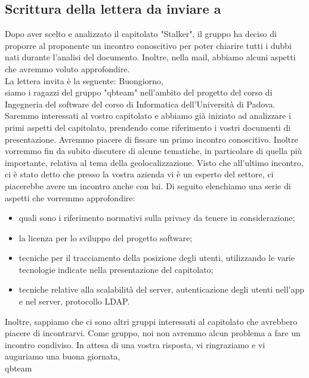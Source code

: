 \subsection{Scrittura della lettera da inviare a \ZD{}}
Dopo aver scelto e analizzato il capitolato "Stalker", il gruppo ha deciso di proporre al proponente \Proponente{} un incontro conoscitivo per poter chiarire tutti i dubbi nati durante l'analisi del documento. Inoltre, nella mail, abbiamo alcuni aspetti che avremmo voluto approfondire.
\\La lettera invita è la seguente:
\bigskip
\newline
Buongiorno,
\\siamo i ragazzi del gruppo "qbteam" nell'ambito del progetto del corso di Ingegneria del software del corso di Informatica dell'Università di Padova. Saremmo interessati al vostro capitolato e abbiamo già iniziato ad analizzare i primi aspetti del capitolato, prendendo come riferimento i vostri documenti di presentazione. Avremmo piacere di fissare un primo incontro conoscitivo. Inoltre vorremmo fin da subito discutere di alcune tematiche, in particolare di quella più importante, relativa al tema della geolocalizzazione. Visto che all'ultimo incontro, ci è stato detto che presso la vostra azienda vi è un esperto del settore, ci piacerebbe avere un incontro anche con lui. Di seguito elenchiamo una serie di aspetti che vorremmo approfondire:
\begin{itemize}
	\item quali sono i riferimento normativi sulla privacy da tenere in considerazione;
	\item la licenza per lo sviluppo del progetto software;
	\item tecniche per il tracciamento della posizione degli utenti, utilizzando le varie tecnologie indicate nella presentazione del capitolato;
	\item tecniche relative alla scalabilità del server, autenticazione degli utenti nell'app e nel server, protocollo LDAP.
\end{itemize}
Inoltre, sappiamo che ci sono altri gruppi interessati al capitolato che avrebbero piacere di incontrarvi. Come gruppo, noi non avremmo alcun problema a fare un incontro condiviso.
In attesa di una vostra risposta, vi ringraziamo e vi auguriamo una buona giornata,
\\qbteam

